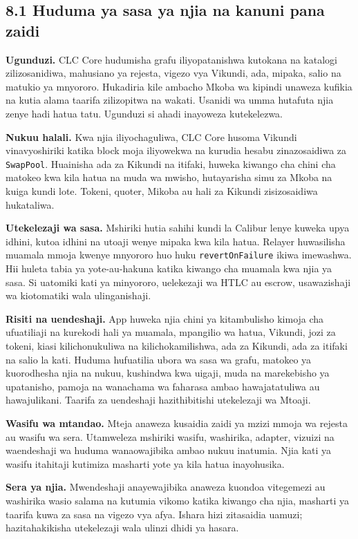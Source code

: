 \documentclass[11pt]{article}
\begin{document}
\subsection*{8.1 Huduma ya sasa ya njia na kanuni pana zaidi}

\textbf{Ugunduzi.} CLC Core hudumisha grafu iliyopatanishwa kutokana na katalogi zilizosanidiwa, mahusiano ya rejesta, vigezo vya Vikundi, ada, mipaka, salio na matukio ya mnyororo. Hukadiria kile ambacho Mkoba wa kipindi unaweza kufikia na kutia alama taarifa zilizopitwa na wakati. Usanidi wa umma hutafuta njia zenye hadi hatua tatu. Ugunduzi si ahadi inayoweza kutekelezwa.

\textbf{Nukuu halali.} Kwa njia iliyochaguliwa, CLC Core husoma Vikundi vinavyoshiriki katika block moja iliyowekwa na kurudia hesabu zinazosaidiwa za \texttt{SwapPool}. Huainisha ada za Kikundi na itifaki, huweka kiwango cha chini cha matokeo kwa kila hatua na muda wa mwisho, hutayarisha simu za Mkoba na kuiga kundi lote. Tokeni, quoter, Mikoba au hali za Kikundi zisizosaidiwa hukataliwa.

\textbf{Utekelezaji wa sasa.} Mshiriki hutia sahihi kundi la Calibur lenye kuweka upya idhini, kutoa idhini na utoaji wenye mipaka kwa kila hatua. Relayer huwasilisha muamala mmoja kwenye mnyororo huo huku \texttt{revertOnFailure} ikiwa imewashwa. Hii huleta tabia ya yote-au-hakuna katika kiwango cha muamala kwa njia ya sasa. Si uatomiki kati ya minyororo, uelekezaji wa HTLC au escrow, usawazishaji wa kiotomatiki wala ulinganishaji.

\textbf{Risiti na uendeshaji.} App huweka njia chini ya kitambulisho kimoja cha ufuatiliaji na kurekodi hali ya muamala, mpangilio wa hatua, Vikundi, jozi za tokeni, kiasi kilichonukuliwa na kilichokamilishwa, ada za Kikundi, ada za itifaki na salio la kati. Huduma hufuatilia ubora wa sasa wa grafu, matokeo ya kuorodhesha njia na nukuu, kushindwa kwa uigaji, muda na marekebisho ya upatanisho, pamoja na wanachama wa faharasa ambao hawajatatuliwa au hawajulikani. Taarifa za uendeshaji hazithibitishi utekelezaji wa Mtoaji.

\textbf{Wasifu wa mtandao.} Mteja anaweza kusaidia zaidi ya mzizi mmoja wa rejesta au wasifu wa sera. Utamweleza mshiriki wasifu, washirika, adapter, vizuizi na waendeshaji wa huduma wanaowajibika ambao nukuu inatumia. Njia kati ya wasifu itahitaji kutimiza masharti yote ya kila hatua inayohusika.

\textbf{Sera ya njia.} Mwendeshaji anayewajibika anaweza kuondoa vitegemezi au washirika wasio salama na kutumia vikomo katika kiwango cha njia, masharti ya taarifa kuwa za sasa na vigezo vya afya. Ishara hizi zitasaidia uamuzi; hazitahakikisha utekelezaji wala ulinzi dhidi ya hasara.
\end{document}

